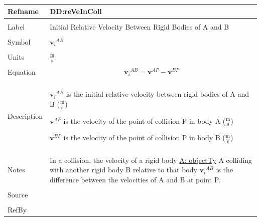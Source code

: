 \documentclass[12pt]{article}
\begin{document}
\noindent \begin{minipage}{\textwidth}
\begin{tabular}{p{} p{}}
\toprule \textbf{Refname} & \textbf{DD:reVeInColl}
\label{DD:reVeInColl}
\\ \midrule \\
Label & Initial Relative Velocity Between Rigid Bodies of A and B
        \\ \midrule \\
        Symbol & ${{\mathbf{v}_{i}}^{AB}}$
                 \\ \midrule \\
                 Units & $\frac{\text{m}}{\text{s}}$
                         \\ \midrule \\
                         Equation & \begin{displaymath}
                                    {{\mathbf{v}_{i}}^{AB}}={\mathbf{v}^{AP}}-{\mathbf{v}^{BP}}
                                    \end{displaymath}
                                    \\ \midrule \\
                                    Description & \begin{symbDescription}
                                                  \item{${{\mathbf{v}_{i}}^{AB}}$ is the initial relative velocity between rigid bodies of A and B ($\frac{\text{m}}{\text{s}}$)}
                                                  \item{${\mathbf{v}^{AP}}$ is the velocity of the point of collision P in body A ($\frac{\text{m}}{\text{s}}$)}
                                                  \item{${\mathbf{v}^{BP}}$ is the velocity of the point of collision P in body B ($\frac{\text{m}}{\text{s}}$)}
                                                  \end{symbDescription}
                                                  \\ \midrule \\
                                                  Notes & In a collision, the velocity of a rigid body \hyperref[assumpOT]{A: objectTy} A colliding with another rigid body B relative to that body ${{\mathbf{v}_{i}}^{AB}}$ is the difference between the velocities of A and B at point P.
                                                          \\ \midrule \\
                                                          Source & \\ \midrule \\
                                                                   RefBy & 
\\ \bottomrule \end{tabular}
\end{minipage}
\end{document}
